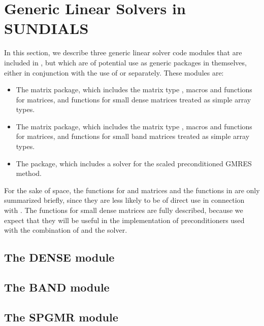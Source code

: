 \chapter{Generic Linear Solvers in SUNDIALS}\label{s:gen_linsolv}
In this section, we describe three generic linear solver code modules that 
are included in {\ida}, but which are of potential use as generic packages in
themselves, either in conjunction with the use of {\ida} or separately.
These modules are:
\begin{itemize}
\item The {\dense} matrix package, which includes the matrix type ,
      macros and functions for  matrices, and functions
      for small dense matrices treated as simple array types.
\item The {\band} matrix package, which includes the matrix type ,
      macros and functions for  matrices, and functions
      for small band matrices treated as simple array types.
\item The {\spgmr} package, which includes a solver for the scaled
      preconditioned GMRES method.
\end{itemize}

For the sake of space, the functions for  and
 matrices and the functions in {\spgmr} are only summarized
briefly, since they are less likely to be of direct use in connection
with {\ida}.  The functions for small dense matrices are fully
described, because we expect that they will be useful in the
implementation of preconditioners used with the combination of {\ida}
and the {\idaspgmr} solver.

\section{The DENSE module}\label{ss:dense}


\section{The BAND module}\label{ss:band}


\section{The SPGMR module}\label{ss:spgmr}


